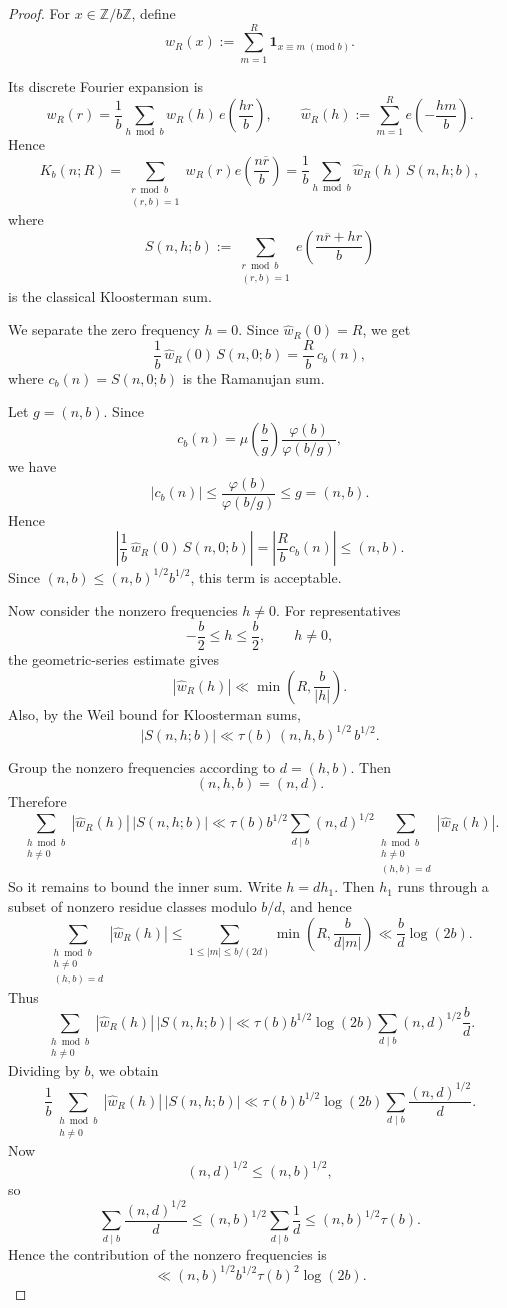 \documentclass[a4paper,american,11pt]{amsart}
\theoremstyle{plain}
\theoremstyle{definition}
\newcommand{\Z}{\mathbb Z}
\newcommand{\ind}{\mathbf 1}
\begin{document}
\begin{proof}
For \(x\in \Z/b\Z\), define
\[
w_R(x):=\sum_{m=1}^R \ind_{x\equiv m\;(\mathrm{mod}\;b)}.
\]

Its discrete Fourier expansion is
\[
w_R(r)=\frac1b\sum_{h\bmod b}\widehat w_R(h)\,e\!\left(\frac{hr}{b}\right),
\qquad
\widehat w_R(h):=\sum_{m=1}^R e\!\left(-\frac{hm}{b}\right).
\]
Hence
\[
K_b(n;R)
=
\sum_{\substack{r\bmod b\\(r,b)=1}} w_R(r)e\!\left(\frac{n\overline r}{b}\right)
=
\frac1b\sum_{h\bmod b}\widehat w_R(h)\,S(n,h;b),
\]
where
\[
S(n,h;b):=\sum_{\substack{r\bmod b\\(r,b)=1}}
e\!\left(\frac{n\overline r+hr}{b}\right)
\]
is the classical Kloosterman sum.

We separate the zero frequency \(h=0\). Since \(\widehat w_R(0)=R\), we get
\[
\frac1b\,\widehat w_R(0)\,S(n,0;b)
=
\frac{R}{b}\,c_b(n),
\]
where \(c_b(n)=S(n,0;b)\) is the Ramanujan sum. 

Let \(g=(n,b)\). Since
\[
c_b(n)=\mu\!\left(\frac{b}{g}\right)\frac{\varphi(b)}{\varphi(b/g)},
\]
we have
\[
|c_b(n)|\leq \frac{\varphi(b)}{\varphi(b/g)}\le g=(n,b).
\]
Hence
\[
\left|\frac1b\,\widehat w_R(0)\,S(n,0;b)\right|
=
\left|\frac{R}{b}c_b(n)\right|
\le (n,b).
\]
Since \((n,b)\le (n,b)^{1/2}b^{1/2}\), this term is acceptable.

Now consider the nonzero frequencies \(h\neq 0\). For representatives
\[
-\frac b2\le h\le \frac b2,\qquad h\neq 0,
\]
the geometric-series estimate gives
\[
|\widehat w_R(h)|
\ll
\min\!\left(R,\frac{b}{|h|}\right).
\]
Also, by the Weil bound for Kloosterman sums,
\[
|S(n,h;b)|\ll \tau(b)\,(n,h,b)^{1/2}\,b^{1/2}.
\]

Group the nonzero frequencies according to \(d=(h,b)\). Then
\[
(n,h,b)=(n,d).
\]
Therefore
\[
\sum_{\substack{h\bmod b\\ h\neq 0}}
|\widehat w_R(h)|\,|S(n,h;b)|
\ll
\tau(b)b^{1/2}
\sum_{d\mid b}(n,d)^{1/2}
\sum_{\substack{h\bmod b\\ h\neq 0\\ (h,b)=d}}
|\widehat w_R(h)|.
\]
So it remains to bound the inner sum. Write \(h=d h_1\). Then \(h_1\) runs through a subset of nonzero residue classes modulo \(b/d\), and hence
\[
\sum_{\substack{h\bmod b\\ h\neq 0\\ (h,b)=d}}
|\widehat w_R(h)|
\le
\sum_{1\le |m|\le b/(2d)}
\min\!\left(R,\frac{b}{d|m|}\right)
\ll
\frac{b}{d}\log(2b).
\]
Thus
\[
\sum_{\substack{h\bmod b\\ h\neq 0}}
|\widehat w_R(h)|\,|S(n,h;b)|
\ll
\tau(b)b^{1/2}\log(2b)
\sum_{d\mid b}(n,d)^{1/2}\frac{b}{d}.
\]
Dividing by \(b\), we obtain
\[
\frac1b\sum_{\substack{h\bmod b\\ h\neq 0}}
|\widehat w_R(h)|\,|S(n,h;b)|
\ll
\tau(b)b^{1/2}\log(2b)
\sum_{d\mid b}\frac{(n,d)^{1/2}}{d}.
\]
Now
\[
(n,d)^{1/2}\le (n,b)^{1/2},
\]
so
\[
\sum_{d\mid b}\frac{(n,d)^{1/2}}{d}
\le
(n,b)^{1/2}\sum_{d\mid b}\frac1d
\le
(n,b)^{1/2}\tau(b).
\]
Hence the contribution of the nonzero frequencies is
\[
\ll
(n,b)^{1/2}b^{1/2}\tau(b)^2\log(2b).
\]


\end{proof}
\end{document}
